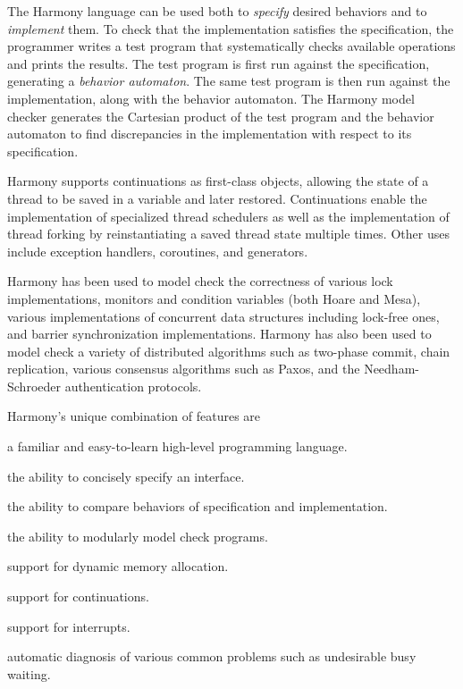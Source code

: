 \documentclass[twocolumn]{article}
\begin{document}
The Harmony language can be used both to \emph{specify} desired
behaviors and to \emph{implement} them.  To check that the implementation
satisfies the specification, the programmer writes a test program that
systematically checks available operations and prints the results.
The test program is first run against the specification, generating
a \emph{behavior automaton}.  The same test program is then run
against the implementation, along with the behavior automaton.
The Harmony model checker generates the Cartesian product of the test program
and the behavior automaton to find discrepancies in the implementation
with respect to its specification.

Harmony supports continuations as first-class objects, allowing the
state of a thread to be saved in a variable and later restored.
Continuations enable the implementation of specialized thread
schedulers as well as the implementation of thread forking by
reinstantiating a saved thread state multiple times.
Other uses include exception handlers, coroutines, and generators.

Harmony has been used to model check the correctness of various lock
implementations, monitors and condition variables (both Hoare and Mesa),
various implementations of concurrent data structures including lock-free
ones, and barrier synchronization implementations.  Harmony has also been
used to model check a variety of distributed algorithms such as two-phase
commit, chain replication, various consensus algorithms such as Paxos,
and the Needham-Schroeder authentication protocols.

Harmony's unique combination of features are
\begin{compactitem}
\item a familiar and easy-to-learn high-level programming language.
\item the ability to concisely specify an interface.
\item the ability to compare behaviors of specification and implementation.
\item the ability to modularly model check programs.
\item support for dynamic memory allocation.
\item support for continuations.
\item support for interrupts.
\item automatic diagnosis of various common problems such as
undesirable busy waiting.
\end{compactitem}
\end{document}
